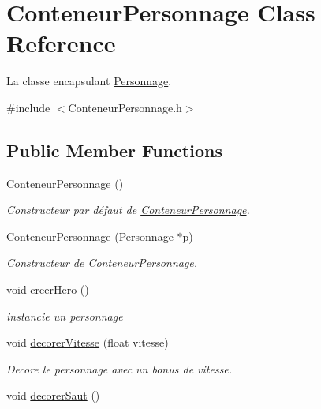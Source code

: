 \hypertarget{classConteneurPersonnage}{\section{Conteneur\-Personnage Class Reference}
\label{classConteneurPersonnage}
}


La classe encapsulant \hyperlink{classPersonnage}{Personnage}.  




{\ttfamily \#include $<$Conteneur\-Personnage.\-h$>$}

\subsection*{Public Member Functions}
\begin{DoxyCompactItemize}
\item 
\hypertarget{classConteneurPersonnage_ae44f959844dfbe858fa9243e1cbfa29b}{\hyperlink{classConteneurPersonnage_ae44f959844dfbe858fa9243e1cbfa29b}{Conteneur\-Personnage} ()}\label{classConteneurPersonnage_ae44f959844dfbe858fa9243e1cbfa29b}

\begin{DoxyCompactList}\small\item\em Constructeur par défaut de \hyperlink{classConteneurPersonnage}{Conteneur\-Personnage}. \end{DoxyCompactList}\item 
\hyperlink{classConteneurPersonnage_abf716c861a5ad4ee0c6bcf35ed194b35}{Conteneur\-Personnage} (\hyperlink{classPersonnage}{Personnage} $\ast$p)
\begin{DoxyCompactList}\small\item\em Constructeur de \hyperlink{classConteneurPersonnage}{Conteneur\-Personnage}. \end{DoxyCompactList}\item 
\hypertarget{classConteneurPersonnage_a8b75a17f9297b1f9ea18cee768bf89f1}{void \hyperlink{classConteneurPersonnage_a8b75a17f9297b1f9ea18cee768bf89f1}{creer\-Hero} ()}\label{classConteneurPersonnage_a8b75a17f9297b1f9ea18cee768bf89f1}

\begin{DoxyCompactList}\small\item\em instancie un personnage \end{DoxyCompactList}\item 
void \hyperlink{classConteneurPersonnage_a39a64f129e31427449f345b49d802582}{decorer\-Vitesse} (float vitesse)
\begin{DoxyCompactList}\small\item\em Decore le personnage avec un bonus de vitesse. \end{DoxyCompactList}\item 
\hypertarget{classConteneurPersonnage_a940e16e4004f117a9b65908a97bea967}{void \hyperlink{classConteneurPersonnage_a940e16e4004f117a9b65908a97bea967}{decorer\-Saut} ()}\label{classConteneurPersonnage_a940e16e4004f117a9b65908a97bea967}


\end{DoxyCompactItemize}
